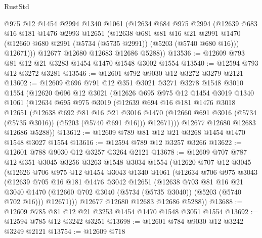 \begin{lexlean}{RustStd}
\begin{coremodule}
        @975
        @12
        @1454
        @2994
        @1340
        @1061
        (@12634
          @684
          @975
          @2994
          (@12639
            @683
            @16
            @181
            @1476
            @2993
            @12651
            (@12638
              @681
              @81
              @16
              @21
              @2991
              @1470
              (@12660 @680 @2991 (@5734 (@5735 @2991)) (@5203 (@5740 @680 @16)))
              @12671)))
        @12677
        @12680
        @12683
        @12686
        @5288))
@13536 := @12609 @793 @81 @12 @21 @3283 @1454 @1470 @1548 @3002 @1554
@13540 := @12594 @793 @12 @3272 @3281
@13546 := @12601 @792 @9030 @12 @3272 @3279 @2121
@13602 := @12609
    @696
    @791
    @12
    @351
    @3021
    @3271
    @3278
    @1548
    @3010
    @1554
    (@12620
      @696
      @12
      @3021
      (@12626
        @695
        @975
        @12
        @1454
        @3019
        @1340
        @1061
        (@12634
          @695
          @975
          @3019
          (@12639
            @694
            @16
            @181
            @1476
            @3018
            @12651
            (@12638
              @692
              @81
              @16
              @21
              @3016
              @1470
              (@12660 @691 @3016 (@5734 (@5735 @3016)) (@5203 (@5740 @691 @16)))
              @12671)))
        @12677
        @12680
        @12683
        @12686
        @5288))
@13612 := @12609 @789 @81 @12 @21 @3268 @1454 @1470 @1548 @3027 @1554
@13616 := @12594 @789 @12 @3257 @3266
@13622 := @12601 @788 @9030 @12 @3257 @3264 @2121
@13678 := @12609
    @707
    @787
    @12
    @351
    @3045
    @3256
    @3263
    @1548
    @3034
    @1554
    (@12620
      @707
      @12
      @3045
      (@12626
        @706
        @975
        @12
        @1454
        @3043
        @1340
        @1061
        (@12634
          @706
          @975
          @3043
          (@12639
            @705
            @16
            @181
            @1476
            @3042
            @12651
            (@12638
              @703
              @81
              @16
              @21
              @3040
              @1470
              (@12660 @702 @3040 (@5734 (@5735 @3040)) (@5203 (@5740 @702 @16)))
              @12671)))
        @12677
        @12680
        @12683
        @12686
        @5288))
@13688 := @12609 @785 @81 @12 @21 @3253 @1454 @1470 @1548 @3051 @1554
@13692 := @12594 @785 @12 @3242 @3251
@13698 := @12601 @784 @9030 @12 @3242 @3249 @2121
@13754 := @12609
    @718

\end{coremodule}
\end{lexlean}

